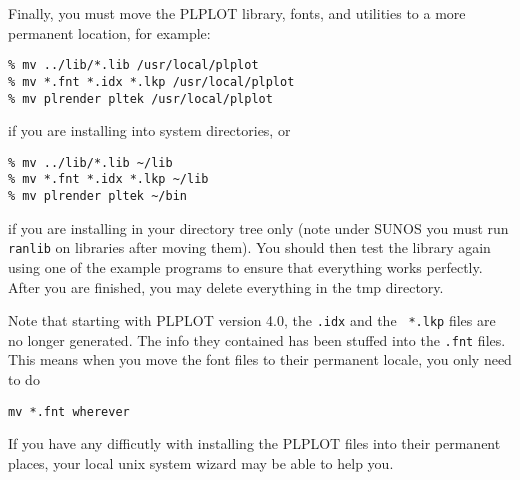 Finally, you must move the PLPLOT library, fonts, and utilities to 
a more permanent location, for example:
\begin{verbatim}
% mv ../lib/*.lib /usr/local/plplot
% mv *.fnt *.idx *.lkp /usr/local/plplot
% mv plrender pltek /usr/local/plplot
\end{verbatim}
if you are installing into system directories, or
\begin{verbatim}
% mv ../lib/*.lib ~/lib
% mv *.fnt *.idx *.lkp ~/lib
% mv plrender pltek ~/bin
\end{verbatim}
if you are installing in your directory tree only (note under SUNOS you must
run {\tt ranlib} on libraries after moving them).  You should then test the
library again using one of the example programs to ensure that everything
works perfectly.  After you are finished, you may delete everything in the
tmp directory.

Note that starting with PLPLOT version 4.0, the {\tt *.idx} and the {\tt
*.lkp} files are no longer generated.  The info they contained has been
stuffed into the {\tt *.fnt} files.  This means when you move the font
files to their permanent locale, you only need to do
\begin{verbatim}
mv *.fnt wherever
\end{verbatim}

If you have any difficutly with installing the PLPLOT files into their
permanent places, your local unix system wizard may be able to help you.
